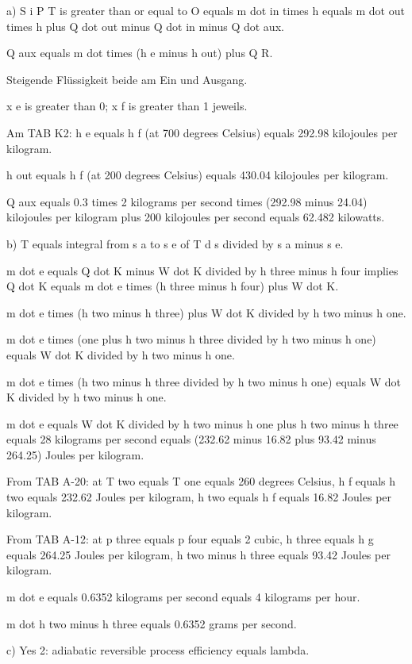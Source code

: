 a) S i P T is greater than or equal to O equals m dot in times h equals m dot out times h plus Q dot out minus Q dot in minus Q dot aux.

Q aux equals m dot times (h e minus h out) plus Q R.

Steigende Flüssigkeit beide am Ein und Ausgang.

x e is greater than 0; x f is greater than 1 jeweils.

Am TAB K2: h e equals h f (at 700 degrees Celsius) equals 292.98 kilojoules per kilogram.

h out equals h f (at 200 degrees Celsius) equals 430.04 kilojoules per kilogram.

Q aux equals 0.3 times 2 kilograms per second times (292.98 minus 24.04) kilojoules per kilogram plus 200 kilojoules per second equals 62.482 kilowatts.

b) T equals integral from s a to s e of T d s divided by s a minus s e.

m dot e equals Q dot K minus W dot K divided by h three minus h four implies Q dot K equals m dot e times (h three minus h four) plus W dot K.

m dot e times (h two minus h three) plus W dot K divided by h two minus h one.

m dot e times (one plus h two minus h three divided by h two minus h one) equals W dot K divided by h two minus h one.

m dot e times (h two minus h three divided by h two minus h one) equals W dot K divided by h two minus h one.

m dot e equals W dot K divided by h two minus h one plus h two minus h three equals 28 kilograms per second equals (232.62 minus 16.82 plus 93.42 minus 264.25) Joules per kilogram.

From TAB A-20: at T two equals T one equals 260 degrees Celsius, h f equals h two equals 232.62 Joules per kilogram, h two equals h f equals 16.82 Joules per kilogram.

From TAB A-12: at p three equals p four equals 2 cubic, h three equals h g equals 264.25 Joules per kilogram, h two minus h three equals 93.42 Joules per kilogram.

m dot e equals 0.6352 kilograms per second equals 4 kilograms per hour.

m dot h two minus h three equals 0.6352 grams per second.

c) Yes 2: adiabatic reversible process efficiency equals lambda.